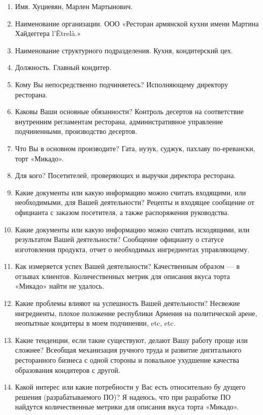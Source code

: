 \begin{enumerate}
	\item{Имя. Хуциевян, Марлен Мартынович.}
	\item{Наименование организации. ООО «Ресторан армянской кухни имени Мартина Хайдеггера l’Être­là.»}
	\item{Наименование структурного подразделения. Кухня, кондитерский цех.}
	\item{Должность. Главный кондитер.}
	\item{Кому Вы непосредственно подчиняетесь? Исполняющему директору ресторана.}
	\item{Каковы Ваши основные обязанности? Контроль десертов на соответствие внутренним регламентам ресторана, административное управление подчиненными, производство десертов.}
	\item{Что Вы в основном производите? Гата, нузук, суджук, пахлаву по-еревански, торт «Микадо».}
	\item{Для кого? Посетителей, проверяющих и выручки директора ресторана.}
	\item{Какие документы или какую информацию можно считать входящими, или необходимыми, для Вашей деятельности? Рецепты и входящее сообщение от официанта с заказом посетителя, а также распоряжения руководства.}
	\item{Какие документы или какую информацию можно считать исходящими, или результатом Вашей деятельности? Сообщение официанту о статусе изготовления продукта, отчет о необходимых ингредиентах управляющему.}
	\item{Как измеряется успех Вашей деятельности? Качественным образом --- в отзывах клиентов. Количественных метрик для описания вкуса торта «Микадо» найти не удалось.}
	\item{Какие проблемы влияют на успешность Вашей деятельности? Несвежие ингредиенты, плохое положение республики Армения на политической арене, неопытные кондитеры в моем подчинении, etc, etc.}
	\item{ Какие тенденции, если такие существуют, делают Вашу работу проще или сложнее? Всеобщая механизация ручного труда и развитие дигитального ресторанного бизнеса с одной стороны и повальное ухудшение качества образования кондитеров с другой.}
	\item{ Какой интерес или какие потребности у Вас есть относительно бу­ дущего решения (разрабатываемого ПО)? Я надеюсь, что при разработке ПО найдутся количественные метрики для описания вкуса торта «Микадо».}
\end{enumerate}

